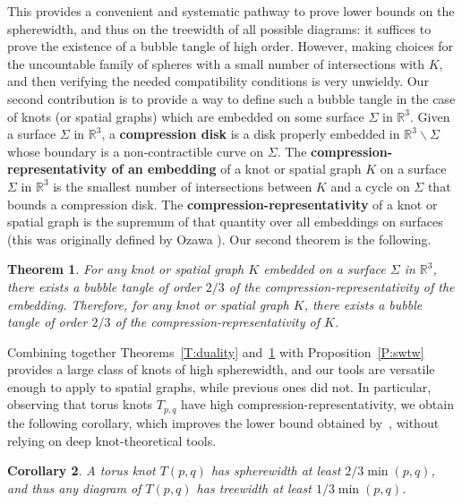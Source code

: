 \documentclass[11pt,a4paper]{article}
\newtheorem{theorem}{Theorem}[section]
\newtheorem{corollary}[theorem]{Corollary}
\begin{document}
This provides a convenient and systematic pathway to prove lower bounds on the spherewidth, and thus on the treewidth of all possible diagrams: it suffices to prove the existence of a bubble tangle of high order. However, making choices for the uncountable family of spheres with a small number of intersections with $K$, and then verifying the needed compatibility conditions is very unwieldy. Our second contribution is to provide a way to define such a bubble tangle in the case of knots (or spatial graphs) which are embedded on some surface $\Sigma$ in $\mathbb{R}^3$. Given a surface $\Sigma$ in $\mathbb{R}^3$, a \textbf{compression disk} is a disk properly embedded in $\mathbb{R}^3 \smallsetminus \Sigma$  whose boundary is a non-contractible curve on $\Sigma$. The \textbf{compression-representativity of an embedding} of a knot or spatial graph $K$ on a surface $\Sigma$ in $\mathbb{R}^3$ is the smallest number of intersections between $K$ and a cycle on $\Sigma$ that bounds a compression disk. The \textbf{compression-representativity} of a knot or spatial graph is the supremum of that quantity over all embeddings on surfaces (this was originally defined by Ozawa \cite{ozawa}). Our second theorem is the following.


\begin{theorem}\label{T:representativity}
For any knot or spatial graph $K$ embedded on a surface $\Sigma$ in $\mathbb{R}^3$, there exists a bubble tangle of order $2/3$ of the compression-representativity of the embedding. Therefore, for any knot or spatial graph $K$, there exists a bubble tangle of order $2/3$ of the compression-representativity of $K$.
\end{theorem}

Combining together Theorems~\ref{T:duality} and~\ref{T:representativity} with Proposition~\ref{P:swtw} provides a large class of knots of high spherewidth, and our tools are versatile enough to apply to spatial graphs, while previous ones did not. In particular, observing that torus knots $T_{p,q}$ have high compression-representativity, we obtain the following corollary, which improves the lower bound obtained by~\cite{Mesmay_treewidth}, without relying on deep knot-theoretical tools.

\begin{corollary}\label{C:torusknots}
A torus knot $T(p,q)$ has spherewidth at least $2/3\min(p,q)$, and thus any diagram of $T(p,q)$ has treewidth at least $1/3 \min(p,q)$.
\end{corollary}
\end{document}
